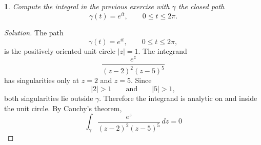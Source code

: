 \documentclass[12pt, a4paper]{report}
\theoremstyle{spaced}
\newtheorem{exercise}{}
\begin{document}
\begin{exercise}
	Compute the integral in the previous exercise with $\gamma$ the closed path
	\[
		\gamma(t)=e^{it},
		\qquad 0\leq t\leq 2\pi.
	\]
\end{exercise}
\begin{proof}[Solution]
	The path
	\[
		\gamma(t)=e^{it},\qquad 0\leq t\leq 2\pi,
	\]
	is the positively oriented unit circle \(|z|=1\).
	The integrand
	\[
		\frac{e^z}{(z-2)^2(z-5)^5}
	\]
	has singularities only at \(z=2\) and \(z=5\). Since
	\[
		|2|>1
		\qquad\text{and}\qquad
		|5|>1,
	\]
	both singularities lie outside \(\gamma\). Therefore the integrand is
	analytic on and inside the unit circle.
	By Cauchy's theorem,
	\[
		\int_{\gamma}
		\frac{e^z}{(z-2)^2(z-5)^5}\,dz=0
	\]
\end{proof}
\end{document}
